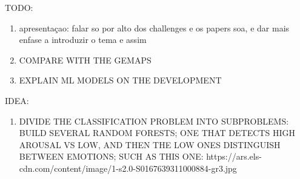 TODO:

\begin{enumerate}
\item apresentaçao: falar so por alto dos challenges e os papers soa, e dar mais enfase a introduzir o tema e assim

\item COMPARE WITH THE GEMAPS
\item EXPLAIN ML MODELS ON THE DEVELOPMENT
\end{enumerate}

IDEA:

\begin{enumerate}
\item DIVIDE THE CLASSIFICATION PROBLEM INTO SUBPROBLEMS: BUILD SEVERAL RANDOM FORESTS; ONE THAT DETECTS HIGH AROUSAL VS LOW, AND THEN THE LOW ONES DISTINGUISH BETWEEN EMOTIONS; SUCH AS THIS ONE: https://ars.els-cdn.com/content/image/1-s2.0-S0167639311000884-gr3.jpg
\end{enumerate}
